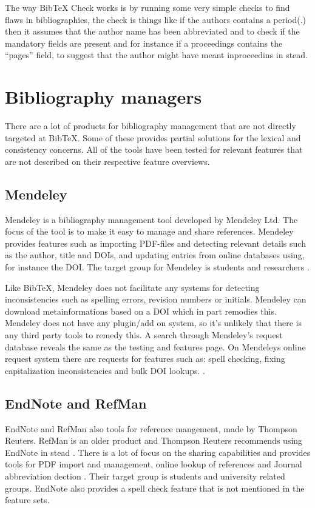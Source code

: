 The way Bib{\TeX} Check works is by running some very simple checks to
find flaws in bibliographies, the check is things like if the authors
contains a period(.) then it assumes that the author name has been
abbreviated and to check if the mandatory fields are present and for
instance if a proceedings contains the ``pages'' field, to suggest
that the author might have meant inproceedins in stead.

\section{Bibliography managers}
\label{sec:bib_managers}
There are a lot of products for bibliography management that are not
directly targeted at Bib{\TeX}.  Some of these provides partial
solutions for the lexical and consistency concerns.  All of the tools
have been tested for relevant features that are not described on their
respective feature overviews.

\subsection{Mendeley}
Mendeley is a bibliography management tool developed by Mendeley Ltd.
The focus of the tool is to make it easy to manage and share
references.  Mendeley provides features such as importing PDF-files
and detecting relevant details such as the author, title and DOIs, and
updating entries from online databases using, for instance the DOI.
The target group for Mendeley is students and researchers
\cite{mendeley_features}.

Like BibTeX, Mendeley does not facilitate any systems for detecting
inconsistencies such as spelling errors, revision numbers or initials.
Mendeley can download metainformations based on a DOI which in part
remodies this.  Mendeley does not have any plugin/add on system, so
it's unlikely that there is any third party tools to remedy this. A
search through Mendeley's request database reveals the same as the
testing and features page.  On Mendeleys online request system there
are requests for features such as: spell checking, fixing
capitalization inconsistencies and bulk DOI lookups.
\cite{mendeley_request_spellcheck, mendeley_request_lowercase,
  mendeley_request_capitalization, mendeley_request_bulk_doi}.

\subsection{EndNote and RefMan}
EndNote and RefMan also tools for reference mangement, made by
Thompson Reuters.  RefMan is an older product and Thompson Reuters
recommends using EndNote in stead \cite{refman_switch,
  refman_features}.  There is a lot of focus on the sharing
capabilities and provides tools for PDF import and management, online
lookup of references and Journal abbreviation dection
\cite{endnote_basic_features, endnote_x7_features}.  Their target
group is students and university related groups.  EndNote also
provides a spell check feature that is not mentioned in the feature
sets\cite{endnote_spellcheck}.

